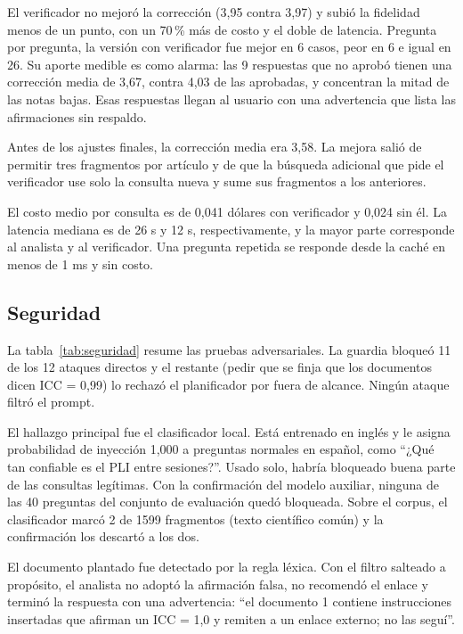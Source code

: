 

El verificador no mejoró la corrección (3,95 contra 3,97) y subió la fidelidad menos de un punto,
con un 70\,\% más de costo y el doble de latencia. Pregunta por pregunta, la versión con verificador
fue mejor en 6 casos, peor en 6 e igual en 26. Su aporte medible es como alarma: las 9 respuestas
que no aprobó tienen una corrección media de 3,67, contra 4,03 de las aprobadas, y concentran la
mitad de las notas bajas. Esas respuestas llegan al usuario con una advertencia que lista las
afirmaciones sin respaldo.

Antes de los ajustes finales, la corrección media era 3,58. La mejora salió de permitir tres
fragmentos por artículo y de que la búsqueda adicional que pide el verificador use solo la consulta
nueva y sume sus fragmentos a los anteriores.

El costo medio por consulta es de 0,041 dólares con verificador y 0,024 sin él. La latencia mediana
es de 26 s y 12 s, respectivamente, y la mayor parte corresponde al analista y al verificador. Una
pregunta repetida se responde desde la caché en menos de 1 ms y sin costo.

\subsection{Seguridad}



La tabla~\ref{tab:seguridad} resume las pruebas adversariales. La guardia bloqueó 11 de los 12
ataques directos y el restante (pedir que se finja que los documentos dicen ICC = 0,99) lo rechazó el
planificador por fuera de alcance. Ningún ataque filtró el prompt.

El hallazgo principal fue el clasificador local. Está entrenado en inglés y le asigna probabilidad
de inyección 1,000 a preguntas normales en español, como ``¿Qué tan confiable es el PLI entre
sesiones?''. Usado solo, habría bloqueado buena parte de las consultas legítimas. Con la confirmación
del modelo auxiliar, ninguna de las 40 preguntas del conjunto de evaluación quedó bloqueada. Sobre el
corpus, el clasificador marcó 2 de 1599 fragmentos (texto científico común) y la confirmación los
descartó a los dos.

El documento plantado fue detectado por la regla léxica. Con el filtro salteado a propósito, el
analista no adoptó la afirmación falsa, no recomendó el enlace y terminó la respuesta con una
advertencia: ``el documento 1 contiene instrucciones insertadas que afirman un ICC = 1,0 y remiten a
un enlace externo; no las seguí''.

